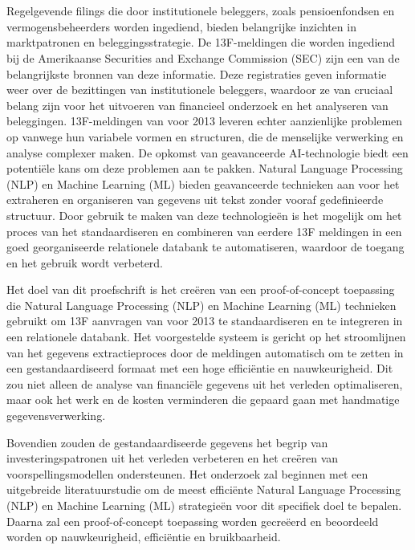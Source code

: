 
\chapter{}%
\label{ch:inleiding}

Regelgevende filings die door institutionele beleggers, zoals pensioenfondsen en vermogensbeheerders worden ingediend, bieden belangrijke inzichten in marktpatronen en beleggingsstrategie. De 13F-meldingen die worden ingediend bij de Amerikaanse Securities and Exchange Commission (SEC) zijn een van de belangrijkste bronnen van deze informatie. Deze registraties geven informatie weer over de bezittingen van institutionele beleggers, waardoor ze van cruciaal belang zijn voor het uitvoeren van financieel onderzoek en het analyseren van beleggingen. 13F-meldingen van voor 2013 leveren echter aanzienlijke problemen op vanwege hun variabele vormen en structuren, die de menselijke verwerking en analyse complexer maken.
De opkomst van geavanceerde AI-technologie biedt een potentiële kans om deze problemen aan te pakken. Natural Language Processing (NLP) en Machine Learning (ML) bieden geavanceerde technieken aan voor het extraheren en organiseren van gegevens uit tekst zonder vooraf gedefinieerde structuur. Door gebruik te maken van deze technologieën is het mogelijk om het proces van het standaardiseren en combineren van eerdere 13F meldingen in een goed georganiseerde relationele databank te automatiseren, waardoor de toegang en het gebruik wordt verbeterd.

Het doel van dit proefschrift is het creëren van een proof-of-concept toepassing die Natural Language Processing (NLP) en Machine Learning (ML) technieken gebruikt om 13F aanvragen van voor 2013 te standaardiseren en te integreren in een relationele databank. Het voorgestelde systeem is gericht op het stroomlijnen van het gegevens extractieproces door de meldingen automatisch om te zetten in een gestandaardiseerd formaat met een hoge efficiëntie en nauwkeurigheid. Dit zou niet alleen de analyse van financiële gegevens uit het verleden optimaliseren, maar ook het werk en de kosten verminderen die gepaard gaan met handmatige gegevensverwerking.

Bovendien zouden de gestandaardiseerde gegevens het begrip van investeringspatronen uit het verleden verbeteren en het creëren van voorspellingsmodellen ondersteunen. Het onderzoek zal beginnen met een uitgebreide literatuurstudie om de meest efficiënte Natural Language Processing (NLP) en Machine Learning (ML) strategieën voor dit specifiek doel te bepalen. Daarna zal een proof-of-concept toepassing worden gecreëerd en beoordeeld worden op nauwkeurigheid, efficiëntie en bruikbaarheid.

